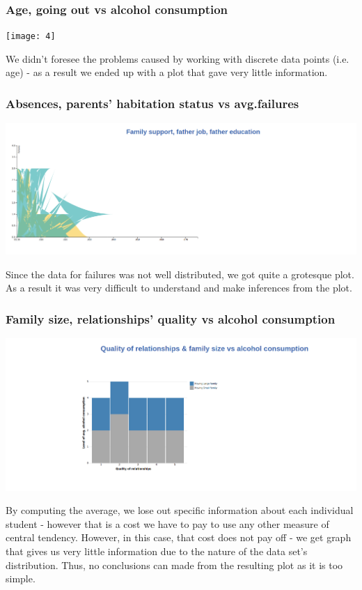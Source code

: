 \documentclass[titlepage, 12pt]{article}
\begin{document}
\subsubsection{Age, going out vs alcohol consumption}
\begin{center}
\texttt{[image: 4]}
\end{center}
We didn't foresee the problems caused by working with discrete data points (i.e.
age) - as a result we ended up with a plot that gave very little information.

\subsubsection{Absences, parents' habitation status vs avg.failures}
\begin{center}
\includegraphics[scale=0.2]{5}
\end{center}
Since the data for failures was not well distributed, we got quite a grotesque
plot. As a result it was very difficult to understand and make inferences from
the plot.
\subsubsection{Family size, relationships' quality vs alcohol consumption}
\begin{center}
\includegraphics[scale=0.2]{8}
\end{center}
By computing the average, we lose out specific information about each individual
student - however that is a cost we have to pay to use any other measure of
central tendency. However, in this case, that cost does not pay off - we get
graph that gives us very little information due to the nature of the data set's
distribution. Thus, no conclusions can made from the resulting plot as it is too
simple.
\end{document}
